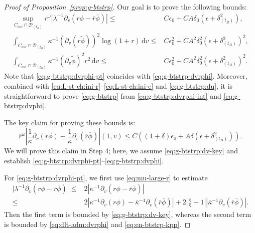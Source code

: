 \documentclass[10pt, reqno]{amsart}
\theoremstyle{definition}
\theoremstyle{remark}
\theoremstyle{conjecture}
\numberwithin{equation}{section}
\newcommand{\abs}[1]{\vert#1\vert}
\newcommand{\ud}{\mathrm{d}}
\newcommand{\rd}{\partial}
\newcommand{\0}{\emptyset}
\newcommand{\dlt}{\delta}
\newcommand{\eps}{\epsilon}
\newcommand{\kpp}{\kappa}
\newcommand{\lmb}{\lambda}
\newcommand{\omg}{\omega}
\newcommand{\calD}{\mathcal D}
\newcommand{\dvr}{\lmb}
\newcommand{\phibg}{\overline{\phi}}				%
\newcommand{\rbg}{\overline{r}}					%
\newcommand{\kppbg}{\overline{\kpp}}					%
\newcommand{\phidf}{\widetilde{\phi}}				%
\newcommand{\Abs}[1]{\left\vert #1 \right\vert}
\begin{document}
\begin{proof}[Proof of Proposition~\ref{prop:g-btstrp}]
Our goal is to prove the following bounds:
\begin{align} 
	\sup_{C_{out} \cap \calD_{(t_{B})}} r^{\omg} \Abs{\dvr^{-1} \rd_{v} (r \phi - \rbg \phibg)}
	\leq & C \eps_{0} + C A \dlt_{0} \left( \eps + \dlt_{(t_{B})}^{2} \right), 		\label{eq:g-btstrp:dvrphi-pt} \\
	\int_{C_{out} \cap \calD_{(t_{B})}} \kpp^{-1} (\rd_{v} (r \phidf))^{2} \log (1 + r) \, \ud v
	\leq & C \eps_{0}^{2} + C A^{2} \dlt_{0}^{2} \left( \eps + \dlt_{(t_{B})}^{2} \right)^{2}, \label{eq:g-btstrp:dvrphi-int} \\
	\int_{C_{out} \cap \calD_{(t_{B})}} \kpp^{-1} (\rd_{v} \phidf)^{2} r^{2} \, \ud v
	\leq & C \eps_{0}^{2} + C A^{2} \dlt_{0}^{2} \left( \eps + \dlt_{(t_{B})}^{2} \right)^{2}. \label{eq:g-btstrp:dvphi} 
\end{align}
Note that \eqref{eq:g-btstrp:dvrphi-pt} coincides with \eqref{eq:g-btstrp-dvrphi}. Moreover, combined with \eqref{eq:L-st-ch:ini-r}--\eqref{eq:L-st-ch:ini-e} and \eqref{eq:g-btstrp:du}, it is straightforward to prove \eqref{eq:g-btstrp} from \eqref{eq:g-btstrp:dvrphi-int} and \eqref{eq:g-btstrp:dvphi}. 

The key claim for proving these bounds is:
\begin{equation} \label{eq:g-btstrp:dv-key}
	\rbg^{\omg}\Abs{\frac{1}{\kpp} \rd_{v} (r \phi) - \frac{1}{\kppbg} \rd_{v} (\rbg \phibg)}(1, v) \leq C \left((1 + \dlt) \eps_{0} + A \dlt \left( \eps + \dlt_{(t_{B})}^{2} \right)\right).
\end{equation}
We will prove this claim in Step 4; here, we assume \eqref{eq:g-btstrp:dv-key} and establish \eqref{eq:g-btstrp:dvrphi-pt}--\eqref{eq:g-btstrp:dvphi}.

For \eqref{eq:g-btstrp:dvrphi-pt}, we first use \eqref{eq:mu-large-r} to estimate
\begin{align*}
	\abs{\dvr^{-1} \rd_{v} (r \phi - \rbg \phibg)}
	\leq & 2 \Abs{\kpp^{-1} \rd_{v} (r \phi - \rbg \phibg)} \\
	\leq & 2 \Abs{\kpp^{-1} \rd_{v} (r \phi) - \kppbg^{-1} \rd_{v}(\rbg \phibg)} + 2 \Abs{\frac{\kppbg}{\kpp} - 1} \Abs{\kppbg^{-1} \rd_{v} (\rbg \phibg)}.
\end{align*}
Then the first term is bounded by \eqref{eq:g-btstrp:dv-key}, whereas the second term is bounded by \eqref{eq:dlt-adm:dvrphi} and \eqref{eq:en-btstrp-kpp}. 


\end{proof}
\end{document}
